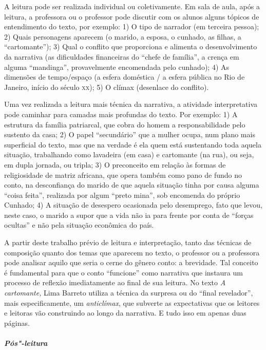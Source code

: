 \documentclass[11pt]{extarticle}
\begin{document}
{{A leitura pode ser realizada individual ou coletivamente. Em sala de
aula, após a leitura, a professora ou o professor pode discutir com os
alunos alguns tópicos de entendimento do texto, por exemplo: 1) O tipo de
narrador (em terceira pessoa); 2) Quais personagens aparecem (o marido,
a esposa, o cunhado, as filhas, a ``cartomante''); 3) Qual o conflito
que proporciona e alimenta o desenvolvimento da narrativa (as
dificuldades financeiras do ``chefe de família'', a crença em alguma
``mandinga'', provavelmente encomendada pelo cunhado); 4) As dimensões
de tempo/espaço (a esfera doméstica / a esfera pública no Rio de
Janeiro, início do século \textsc{xx}); 5) O clímax (desenlace do conflito).

Uma vez realizada a leitura mais técnica da narrativa, a atividade
interpretativa pode caminhar para camadas mais profundas do texto. Por
exemplo: 1) A estrutura da família patriarcal, que cobra do homem a
responsabilidade pelo sustento da casa; 2) O papel ``secundário'' que a
mulher ocupa, num plano mais superficial do texto, mas que na verdade é
ela quem está sustentando toda aquela situação, trabalhando como
lavadeira (em casa) e cartomante (na rua), ou seja, em dupla jornada, ou
tripla; 3) O preconceito em relação às formas de religiosidade de matriz
africana, que opera também como pano de fundo no conto, na desconfiança
do marido de que aquela situação tinha por causa alguma ``coisa feita'',
realizada por algum ``preto mina'', sob encomenda do próprio Cunhado; 4)
A situação de desespero ocasionada pelo desemprego, fato que levou,
neste caso, o marido a supor que a vida não ia para frente por conta de
``forças ocultas'' e não pela situação econômica do país.

A partir deste trabalho prévio de leitura e interpretação, tanto das
técnicas de composição quanto dos temas que aparecem no texto, o
professor ou a professora pode analisar aquilo que seria o cerne do
gênero conto: a brevidade. Tal conceito é fundamental para que o conto
``funcione'' como narrativa que instaura um processo de reflexão
imediatamente ao final de sua leitura. No texto {\textit{A
cartomante,}} Lima Barreto utiliza a técnica da surpresa ou do ``final
revelador'', mais especificamente, um \emph{anticlímax}, que subverte as
expectativas que os leitores e leitoras vão construindo ao longo da
narrativa. E tudo isso em apenas duas páginas.

\paragraph{\textit{Pós"-leitura}}

}}
\end{document}
